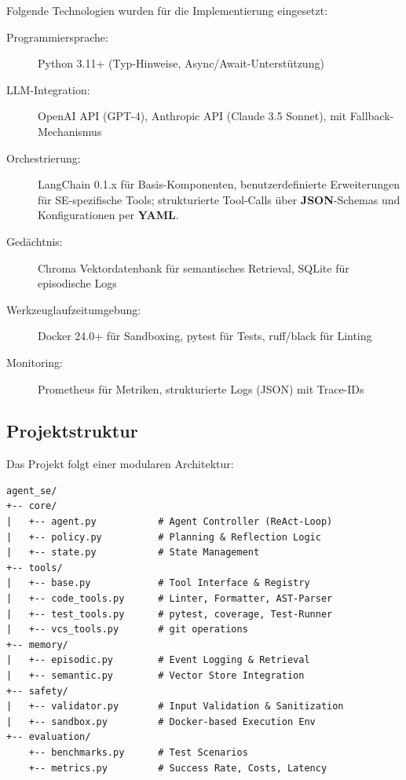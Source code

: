 Folgende Technologien wurden für die Implementierung eingesetzt:

\begin{sloppypar}
\begin{description}
  \item[Programmiersprache:] Python 3.11+ (Typ-Hinweise, Async/Await-Un\-ter\-stüt\-zung)
  \item[LLM-Integration:] OpenAI API (GPT-4), Anthropic API (Claude 3.5 Sonnet), mit Fallback-Mechanismus
  \item[Orchestrierung:] LangChain 0.1.x für Basis-Komponenten, benutzerdefinierte Erweiterungen für SE-spezifische Tools; strukturierte Tool-Calls über \textbf{JSON}-Schemas und Konfigurationen per \textbf{YAML}.
  \item[Gedächtnis:] Chroma Vektordatenbank für semantisches Retrieval, SQLite für episodische Logs
  \item[Werkzeuglaufzeitumgebung:] Docker 24.0+ für Sandboxing, pytest für Tests, ruff/black für Linting
  \item[Monitoring:] Prometheus für Metriken, strukturierte Logs (JSON) mit Trace-IDs
\end{description}
\end{sloppypar}

\subsection{Projektstruktur}

Das Projekt folgt einer modularen Architektur:

\begin{lstlisting}[breaklines=true, basicstyle=\ttfamily\small]
agent_se/
+-- core/
|   +-- agent.py           # Agent Controller (ReAct-Loop)
|   +-- policy.py          # Planning & Reflection Logic
|   +-- state.py           # State Management
+-- tools/
|   +-- base.py            # Tool Interface & Registry
|   +-- code_tools.py      # Linter, Formatter, AST-Parser
|   +-- test_tools.py      # pytest, coverage, Test-Runner
|   +-- vcs_tools.py       # git operations
+-- memory/
|   +-- episodic.py        # Event Logging & Retrieval
|   +-- semantic.py        # Vector Store Integration
+-- safety/
|   +-- validator.py       # Input Validation & Sanitization
|   +-- sandbox.py         # Docker-based Execution Env
+-- evaluation/
    +-- benchmarks.py      # Test Scenarios
    +-- metrics.py         # Success Rate, Costs, Latency
\end{lstlisting}

